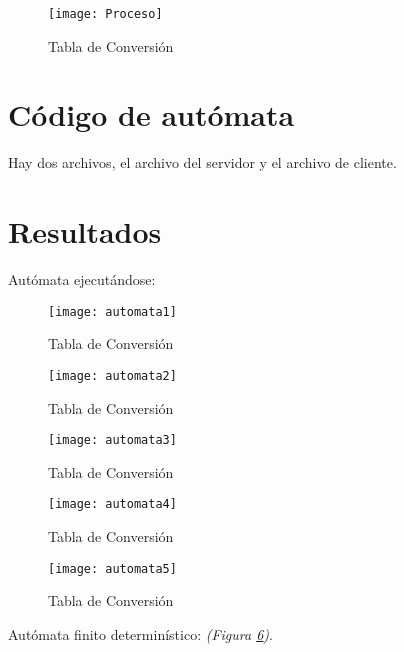 \documentclass{article}
\begin{document}
	\begin{figure}[h]
    \centering
    \texttt{[image: Proceso]}
    \caption{Tabla de Conversión}
    \label{fig:proceso}
	\end{figure}
	
	\section{Código de autómata}
	Hay dos archivos, el archivo del servidor y el archivo de cliente.
	
	

	
	

	\newpage
	\section{Resultados}	
	Autómata ejecutándose:	
	
	\begin{figure}
    \centering
    \texttt{[image: automata1]}
    \caption{Tabla de Conversión}
    \label{fig:proceso}
	\end{figure}

	\begin{figure}
	\centering
    \texttt{[image: automata2]}
    \caption{Tabla de Conversión}
    \label{fig:proceso}
	\end{figure}    
    
	\begin{figure}
	\centering
    \texttt{[image: automata3]}
    \caption{Tabla de Conversión}
    \label{fig:proceso}
	\end{figure}
    
	\begin{figure}
	\centering
    \texttt{[image: automata4]}
    \caption{Tabla de Conversión}
    \label{fig:proceso}
	\end{figure}
    
	\begin{figure}
	\centering
    \texttt{[image: automata5]}
    \caption{Tabla de Conversión}
    \label{fig:proceso} 
	\end{figure}   
    	
	
	\newpage
	Autómata finito determinístico: \textit{(Figura \ref{fig:proceso})}.\par
	
\end{document}
